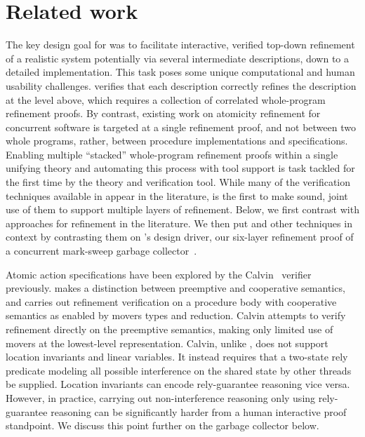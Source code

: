 
\section{Related work}
\label{sec:related}

The key design goal for \civl was to facilitate interactive, verified top-down refinement
of a realistic system potentially via several intermediate
descriptions, down to a detailed implementation.  
This task poses some unique computational and human usability challenges. 
\civl verifies that each description correctly refines the description
at the level above, which requires a collection of correlated
whole-program refinement proofs. 
By contrast, existing work on atomicity refinement for concurrent software is
targeted at a single refinement proof, and not between two whole
programs, rather, between procedure implementations and
specifications. 
Enabling multiple ``stacked'' whole-program refinement proofs
within a single unifying theory and automating this process with tool support is task tackled for the first time by the
\civl theory and verification tool. 
While many of the verification techniques available in \civl appear in
the literature, \civl is the first to make sound, joint use of them to
support multiple layers of refinement. 
Below, we first contrast \civl with approaches for 
refinement in the literature. 
We then put \civl and other techniques in context by contrasting them
on \civl's design driver, our six-layer refinement proof of a
concurrent mark-sweep garbage collector~\cite{gc-techreport}.


Atomic action specifications have been explored by the
Calvin~\cite{FlanaganFQS05} verifier previously. 
\civl makes a distinction between preemptive and cooperative
semantics, and carries out refinement verification on a procedure body
with cooperative semantics as enabled by movers types and reduction.
Calvin attempts to verify refinement directly on the preemptive
semantics, making only limited use of movers at the lowest-level
representation. 
Calvin, unlike \civl, does not support location invariants and linear
variables. 
It instead requires that a two-state rely predicate modeling all possible
interference on the shared state by other threads be supplied. 
Location invariants can encode rely-guarantee reasoning vice versa. 
However, in practice, carrying out non-interference reasoning only
using rely-guarantee reasoning can be significantly harder from a
human interactive proof standpoint. We discuss this point further on
the garbage collector below. 

